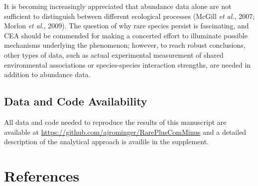 \documentclass[
]{article}
\begin{document}
It is becoming increasingly appreciated that abundance data alone are
not sufficient to distinguish between different ecological processes
(McGill \emph{et al.}, 2007; Morlon \emph{et al.}, 2009). The question
of why rare species persist is fascinating, and CEA should be commended
for making a concerted effort to illuminate possible mechanisms
underlying the phenomenon; however, to reach robust conclusions, other
types of data, such as actual experimental measurement of shared
environmental associations or species-species interaction strengths, are
needed in addition to abundance data.

\hypertarget{data-and-code-availability}{%
\subsection{Data and Code
Availability}\label{data-and-code-availability}}

All data and code needed to reproduce the results of this manuscript are
available at \url{https://github.com/ajrominger/RarePlusComMinus} and a
detailed description of the analytical approach is availile in the
supplement.

\clearpage

\hypertarget{references}{%
\section*{References}\label{references}}
\end{document}
